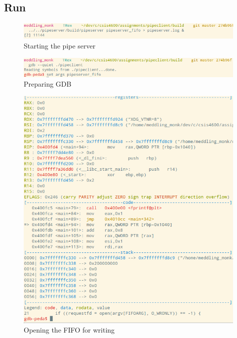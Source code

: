 \documentclass[letter,12pt,sffamily]{article}
\begin{document}
\subsection{Run}
\begin{figure}[H]
	\centering
	\includegraphics[width=1\linewidth]{./images/15}
	\caption[starting_pipe_server]{Starting the pipe server}
	\label{fig:16}
\end{figure}
\begin{figure}[H]
	\centering
	\includegraphics[width=1\linewidth]{./images/16}
	\caption[preparing_gdb]{Preparing GDB}
	\label{fig:17}
\end{figure}
\begin{figure}[H]
	\centering
	\includegraphics[width=1\linewidth]{./images/17}
	\caption[opening_fifo]{Opening the FIFO for writing}
	\label{fig:18}
\end{figure}
\end{document}
